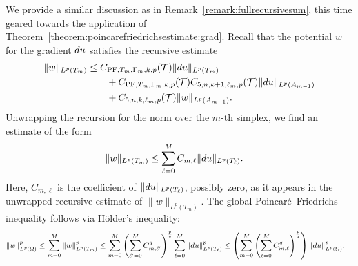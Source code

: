 \documentclass[10pt,a4paper]{article}
\begin{document}
\begin{remark}\label{remark:fullrecursivesum:exterior}
    \color{red}
    We provide a similar discussion as in Remark~\ref{remark:fullrecursivesum}, 
    this time geared towards the application of Theorem~\ref{theorem:poincarefriedrichsestimate:grad}.
    Recall that the potential $w$ for the gradient $d u$ satisfies the recursive estimate 
    \begin{align*}
        \| w \|_{L^{p}(T_{m})}
        &
        \leq  
        C_{{\rm PF},T_{m},\Gamma_{m},k,p}({\mathcal T}) 
        \| d u      \|_{L^{p}(T_{m})} 
        \\&\qquad
        +
        C_{{\rm PF},T_{m},\Gamma_{m},k,p}({\mathcal T}) 
        C_{5,n,k+1,\ell_{m},p}({\mathcal T})
        \| d u \|_{L^{p}(A_{m-1})}
        \\&\qquad
        + 
        C_{5,n,k,\ell_{m},p}({\mathcal T}) 
        \| w \|_{L^{p}(A_{m-1})}
        .
    \end{align*}
    Unwrapping the recursion for the norm over the $m$-th simplex, 
    we find an estimate of the form 
    \begin{align}\label{math:fullrecursivesum:exterior}
        \| w \|_{L^{p}(T_{m})} 
        &
        \leq 
        \sum_{\ell=0}^{M} C_{m,\ell} \| d u \|_{L^{p}(T_{\ell})}
        .
    \end{align}
    Here, $C_{m,\ell}$ is the coefficient of $\| d u \|_{L^{p}(T_{\ell})}$, possibly zero, 
    as it appears in the unwrapped recursive estimate of $\| w \|_{L^{p}(T_{m})}$. 
    The global Poincar\'e--Friedrichs inequality follows via H\"older's inequality:
    \begin{align*}
        \| w \|_{L^{p}(\Omega)}^{p}
        &
        \leq 
        \sum_{m=0}^{M}
        \| w \|_{L^{p}(T_{m})}^{p}
        \leq 
        \sum_{m=0}^{M}
        \left( \sum_{\ell'=0}^{M} C_{m,\ell'}^{q} \right)^{\frac p q}
        \sum_{\ell=0}^{M} 
        \| \cartan u \|_{L^{p}(T_{\ell})}^{p} 
        \leq 
        \left(
            \sum_{m=0}^{M}
            \left( \sum_{\ell=0}^{M} C_{m,\ell}^{q} \right)^{\frac p q}
        \right)
        \| \cartan u \|_{L^{p}(\Omega)}^{p} 
        ,

\end{align*}
\end{remark}
\end{document}
